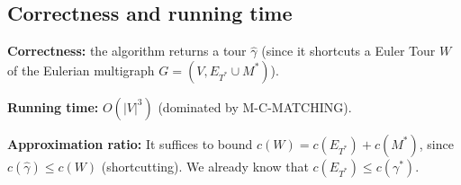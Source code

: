 \subsection{Correctness and running time}
\textbf{Correctness:} the algorithm returns a tour $\widehat\gamma$ (since it shortcuts a Euler Tour $W$ of the Eulerian multigraph $G=(V,E_{T^*}\cup M^*)$).

\textbf{Running time:} $O(|V|^3)$ (dominated by M-C-MATCHING).

\textbf{Approximation ratio:} It suffices to bound $c(W)=c(E_{T^*})+c(M^*)$, since $c(\widehat\gamma)\leq c(W)$ (shortcutting). We already know that $c(E_{T^*})\leq c(\gamma^*)$.
